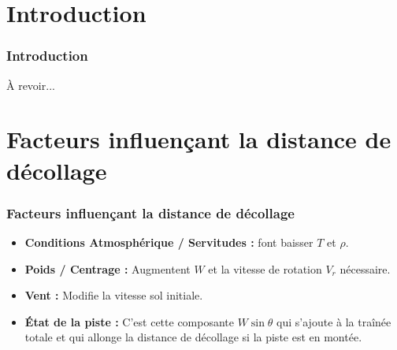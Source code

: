 	\section{Introduction}

\begin{frame}
	\frametitle{Introduction}
	À revoir...
	
	
	
	
	
\end{frame}






\section{Facteurs influençant la distance de décollage}

\begin{frame}
	\frametitle{Facteurs influençant la distance de décollage}
	
	
		\begin{itemize}
		\item \textbf{Conditions Atmosphérique / Servitudes :} font baisser $T$ et $\rho$.
		\item \textbf{Poids / Centrage :} Augmentent $W$ et la vitesse de rotation $V_r$ nécessaire.
		\item \textbf{Vent :} Modifie la vitesse sol initiale.
		\item \textbf{État de la piste :} C'est cette composante $W \sin \theta$ qui s'ajoute à la traînée totale et qui allonge la distance de décollage si la piste est en montée.\\
		
	\end{itemize}
\end{frame}